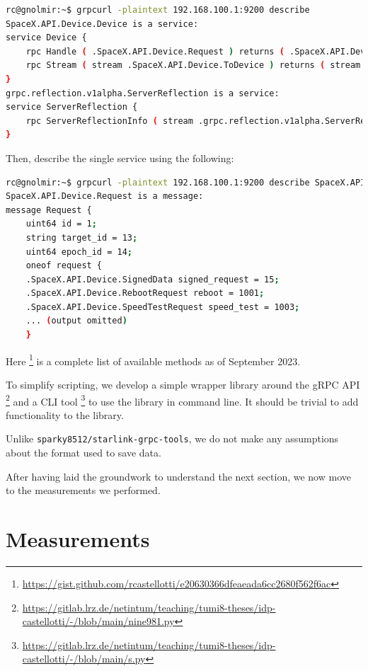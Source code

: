 \documentclass[IN,11pt,twoside,openright,idp,english]{tumthesis}
\begin{document}
\begin{lstlisting}[language=bash]
rc@gnolmir:~$ grpcurl -plaintext 192.168.100.1:9200 describe
SpaceX.API.Device.Device is a service:
service Device {
    rpc Handle ( .SpaceX.API.Device.Request ) returns ( .SpaceX.API.Device.Response );
    rpc Stream ( stream .SpaceX.API.Device.ToDevice ) returns ( stream .SpaceX.API.Device.FromDevice );
}
grpc.reflection.v1alpha.ServerReflection is a service:
service ServerReflection {
    rpc ServerReflectionInfo ( stream .grpc.reflection.v1alpha.ServerReflectionRequest ) returns ( stream .grpc.reflection.v1alpha.ServerReflectionResponse );
}
\end{lstlisting}
    
Then, describe the single service using the following:
    
\begin{lstlisting}[language=bash]
rc@gnolmir:~$ grpcurl -plaintext 192.168.100.1:9200 describe SpaceX.API.Device.Request
SpaceX.API.Device.Request is a message:
message Request {
    uint64 id = 1;
    string target_id = 13;
    uint64 epoch_id = 14;
    oneof request {
    .SpaceX.API.Device.SignedData signed_request = 15;
    .SpaceX.API.Device.RebootRequest reboot = 1001;
    .SpaceX.API.Device.SpeedTestRequest speed_test = 1003;
    ... (output omitted)
    }
\end{lstlisting}
    
Here \footnote{\url{https://gist.github.com/rcastellotti/e20630366dfeaeada6cc2680f562f6ac}} is a complete list of available methods as of September 2023.

To simplify scripting, we develop a simple wrapper library around the gRPC API  \footnote{\url{https://gitlab.lrz.de/netintum/teaching/tumi8-theses/idp-castellotti/-/blob/main/nine981.py}} and a CLI tool \footnote{\url{https://gitlab.lrz.de/netintum/teaching/tumi8-theses/idp-castellotti/-/blob/main/s.py}} to use the library in command line. It should be trivial to add functionality to the library.

Unlike \texttt{sparky8512/starlink-grpc-tools}, we do not make any assumptions about the format used to save data.

After having laid the groundwork to understand the next section, we now move to the measurements we performed.
    
\chapter{Measurements}
\end{document}
